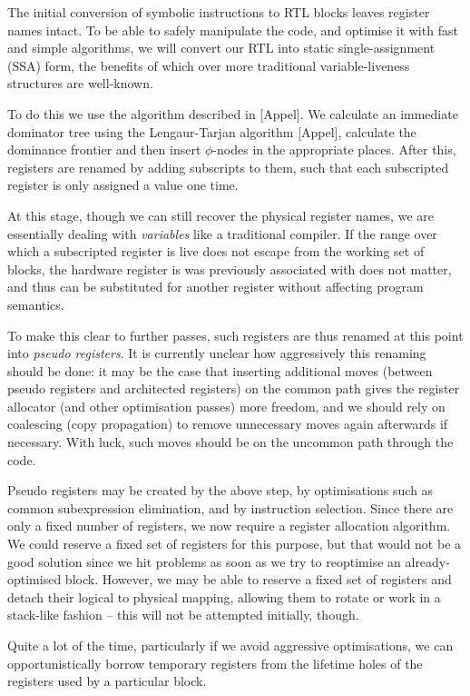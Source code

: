 The initial conversion of symbolic instructions to RTL blocks leaves register names intact. To be able to safely manipulate the code, and optimise it with fast and simple algorithms, we will convert our RTL into static single-assignment (SSA) form, the benefits of which over more traditional variable-liveness structures are well-known.

To do this we use the algorithm described in [Appel]. We calculate an immediate dominator tree using the Lengaur-Tarjan algorithm [Appel], calculate the dominance frontier and then insert $\phi$-nodes in the appropriate places. After this, registers are renamed by adding subscripts to them, such that each subscripted register is only assigned a value one time.

At this stage, though we can still recover the physical register names, we are essentially dealing with \emph{variables} like a traditional compiler. If the range over which a subscripted register is live does not escape from the working set of blocks, the hardware register is was previously associated with does not matter, and thus can be substituted for another register without affecting program semantics.

To make this clear to further passes, such registers are thus renamed at this point into \emph{pseudo registers}. It is currently unclear how aggressively this renaming should be done: it may be the case that inserting additional moves (between pseudo registers and architected registers) on the common path gives the register allocator (and other optimisation passes) more freedom, and we should rely on coalescing (copy propagation) to remove unnecessary moves again afterwards if necessary. With luck, such moves should be on the uncommon path through the code.

Pseudo registers may be created by the above step, by optimisations such as common subexpression elimination, and by instruction selection. Since there are only a fixed number of registers, we now require a register allocation algorithm. We could reserve a fixed set of registers for this purpose, but that would not be a good solution since we hit problems as soon as we try to reoptimise an already-optimised block. However, we may be able to reserve a fixed set of registers and detach their logical to physical mapping, allowing them to rotate or work in a stack-like fashion -- this will not be attempted initially, though.

Quite a lot of the time, particularly if we avoid aggressive optimisations, we can opportunistically borrow temporary registers from the lifetime holes of the registers used by a particular block. 

